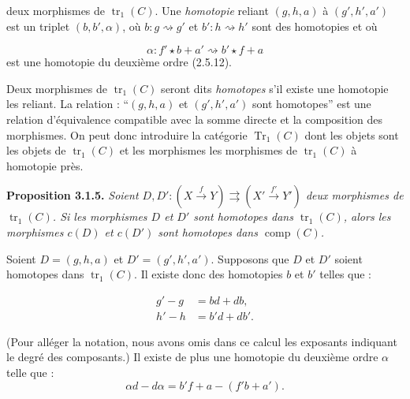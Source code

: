 \clearpage
{}%
deux morphismes de $\operatorname{tr}_1(C)$. Une \emph{homotopie} reliant
$(g,h,a)$ à $(g',h',a')$ est un triplet $(b,b',\alpha)$, où
$b\colon g\rightsquigarrow g'$ et $b'\colon h\rightsquigarrow h'$ sont des
homotopies et où

\begin{equation*}
  \alpha\colon f'\star b+a'\rightsquigarrow b'\star f+a
\end{equation*}
est une homotopie du deuxième ordre (2.5.12).

Deux morphismes de $\operatorname{tr}_1(C)$ seront dits \emph{homotopes} s'il
existe une homotopie les reliant.
La relation : ``$(g,h,a)$ et $(g',h',a')$ sont homotopes'' est une relation
d'équivalence compatible avec la somme directe et la composition des
morphismes.
On peut donc introduire la catégorie $\operatorname{Tr}_1(C)$ dont les objets
sont les objets de $\operatorname{tr}_1(C)$ et les morphismes les morphismes de
$\operatorname{tr}_1(C)$ à homotopie près.

\noindent\textbf{Proposition 3.1.5.}\quad
\emph{Soient
$D,D'\colon (X\xrightarrow{f}Y)\rightrightarrows
(X'\xrightarrow{f'}Y')$ deux morphismes de $\operatorname{tr}_1(C)$. Si les
morphismes $D$ et $D'$ sont homotopes dans $\operatorname{tr}_1(C)$, alors les
morphismes $c(D)$ et $c(D')$ sont homotopes dans $\operatorname{comp}(C)$.}

Soient $D=(g,h,a)$ et $D'=(g',h',a')$. Supposons que $D$ et $D'$ soient
homotopes dans $\operatorname{tr}_1(C)$. Il existe donc des homotopies $b$ et
$b'$ telles que :

\begin{equation}
  \begin{aligned}
    g'-g&=bd+db,\\
    h'-h&=b'd+db'.
  \end{aligned}
  \tag{3.1.5.1}
\end{equation}

(Pour alléger la notation, nous avons omis dans ce calcul les exposants
indiquant le degré des composants.)
Il existe de plus une homotopie du deuxième ordre $\alpha$ telle que :
\begin{equation*}
  \alpha d-d\alpha=b'f+a-(f'b+a').
\end{equation*}

